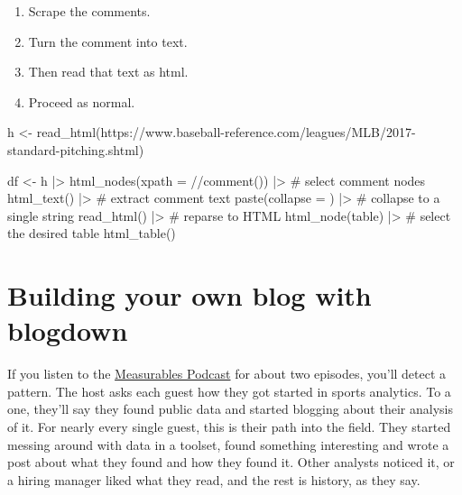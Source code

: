 \documentclass[
  letterpaper,
  DIV=11,
  numbers=noendperiod]{scrreprt}
\newenvironment{Shaded}{\begin{snugshade}}{\end{snugshade}}
\newcommand{\AttributeTok}[1]{\textcolor[rgb]{0.40,0.45,0.13}{#1}}
\newcommand{\CommentTok}[1]{\textcolor[rgb]{0.37,0.37,0.37}{#1}}
\newcommand{\FunctionTok}[1]{\textcolor[rgb]{0.28,0.35,0.67}{#1}}
\newcommand{\NormalTok}[1]{\textcolor[rgb]{0.00,0.23,0.31}{#1}}
\newcommand{\OtherTok}[1]{\textcolor[rgb]{0.00,0.23,0.31}{#1}}
\newcommand{\SpecialCharTok}[1]{\textcolor[rgb]{0.37,0.37,0.37}{#1}}
\newcommand{\StringTok}[1]{\textcolor[rgb]{0.13,0.47,0.30}{#1}}
\providecommand{\tightlist}{%
  \setlength{\itemsep}{0pt}\setlength{\parskip}{0pt}}\usepackage{longtable,booktabs,array}
\begin{document}
\begin{enumerate}
\def\labelenumi{\arabic{enumi}.}
\tightlist
\item
  Scrape the comments.
\item
  Turn the comment into text.
\item
  Then read that text as html.
\item
  Proceed as normal.
\end{enumerate}

\begin{Shaded}
\begin{Highlighting}[]
\NormalTok{h }\OtherTok{\textless{}{-}} \FunctionTok{read\_html}\NormalTok{(}\StringTok{\textquotesingle{}https://www.baseball{-}reference.com/leagues/MLB/2017{-}standard{-}pitching.shtml\textquotesingle{}}\NormalTok{)}

\NormalTok{df }\OtherTok{\textless{}{-}}\NormalTok{ h }\SpecialCharTok{|\textgreater{}} \FunctionTok{html\_nodes}\NormalTok{(}\AttributeTok{xpath =} \StringTok{\textquotesingle{}//comment()\textquotesingle{}}\NormalTok{) }\SpecialCharTok{|\textgreater{}}    \CommentTok{\# select comment nodes}
    \FunctionTok{html\_text}\NormalTok{() }\SpecialCharTok{|\textgreater{}}    \CommentTok{\# extract comment text}
    \FunctionTok{paste}\NormalTok{(}\AttributeTok{collapse =} \StringTok{\textquotesingle{}\textquotesingle{}}\NormalTok{) }\SpecialCharTok{|\textgreater{}}    \CommentTok{\# collapse to a single string}
    \FunctionTok{read\_html}\NormalTok{() }\SpecialCharTok{|\textgreater{}}    \CommentTok{\# reparse to HTML}
    \FunctionTok{html\_node}\NormalTok{(}\StringTok{\textquotesingle{}table\textquotesingle{}}\NormalTok{) }\SpecialCharTok{|\textgreater{}}    \CommentTok{\# select the desired table}
    \FunctionTok{html\_table}\NormalTok{() }
\end{Highlighting}
\end{Shaded}


\hypertarget{building-your-own-blog-with-blogdown}{%
\chapter{Building your own blog with
blogdown}\label{building-your-own-blog-with-blogdown}}

If you listen to the
\href{https://www.measurablespod.com/podcast}{Measurables Podcast} for
about two episodes, you'll detect a pattern. The host asks each guest
how they got started in sports analytics. To a one, they'll say they
found public data and started blogging about their analysis of it. For
nearly every single guest, this is their path into the field. They
started messing around with data in a toolset, found something
interesting and wrote a post about what they found and how they found
it. Other analysts noticed it, or a hiring manager liked what they read,
and the rest is history, as they say.
\end{document}

